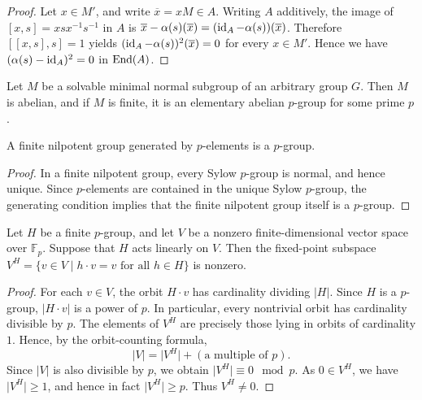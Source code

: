 
\begin{proof}
Let $x\in M'$, and write $\overline{x}=xM\in A$. Writing $A$ additively, the image of $[x,s]=xsx^{-1}s^{-1}$ in $A$ is $\overline{x}-\alpha(s)(\overline{x})=(\operatorname{id}_A-\alpha(s))(\overline{x})$.
Therefore $[[x,s],s]=1$ yields $(\operatorname{id}_A-\alpha(s))^2(\overline{x})=0$ for every $x\in M'$. Hence we have $(\alpha(s)-\operatorname{id}_A)^2=0$ in $\operatorname{End}(A)$.
\end{proof}


\begin{lem}
\label{fact:finite_solvable_minimal_normal_subgroup_is_elementary_abelian_p-group}
    Let $M$ be a solvable minimal normal subgroup of an arbitrary group $G$.
    Then $M$ is abelian, and if $M$ is finite, it is an elementary abelian $p$-group for some prime $p$.
\end{lem}

\begin{lem}%
\label{lemma:finite_nilpotent_generated_by_p-elements_is_p-group}
    A finite nilpotent group generated by $p$-elements is a $p$-group.
\end{lem}

\begin{proof}
    In a finite nilpotent group, every Sylow $p$-group is normal, and hence unique. Since $p$-elements are contained in the unique Sylow $p$-group, the generating condition implies that the finite nilpotent group itself is a $p$-group.
\end{proof}

\begin{lem}
\label{lemma:invariant_space_of_finite_vector_space_with_p-group_action_is_nontrivial}
    Let $H$ be a finite $p$-group, and let $V$ be a nonzero finite-dimensional vector space over $\mathbb{F}_{p}$.
    Suppose that $H$ acts linearly on $V$.
    Then the fixed-point subspace $V^H=\{v \in V \mid h\cdot v=v \text{ for all } h\in H \}$ is nonzero.
\end{lem}

\begin{proof}
    For each $v \in V$, the orbit $H\cdot v$ has cardinality dividing $\lvert H \rvert$. Since $H$ is a $p$-group, $\lvert H\cdot v\rvert$ is a power of $p$. In particular, every nontrivial orbit has cardinality divisible by $p$. The elements of $V^H$ are precisely those lying in orbits of cardinality $1$. Hence, by the orbit-counting formula,
    \[ \lvert V \rvert = \lvert V^H \rvert + (\text{a multiple of }p). \]
    Since $\lvert V\rvert$ is also divisible by $p$, we obtain $\lvert V^H \rvert \equiv 0 \mod p$. As $0\in V^H$, we have $\lvert V^H \rvert \geq 1$, and hence in fact $\lvert V^H \rvert \geq p$. Thus $V^H\neq 0$. 
\end{proof}

